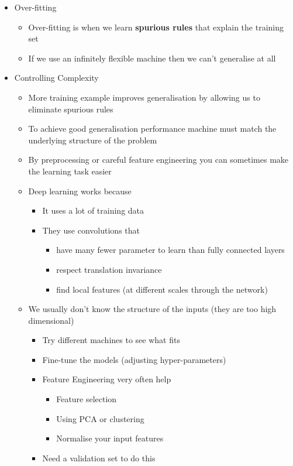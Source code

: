 \documentclass[11pt]{article}
\begin{document}
\begin{itemize}
\item Over-fitting
\begin{itemize}
\item Over-fitting is when we learn \textbf{spurious rules} that explain the
training set
\item If we use an infinitely flexible machine then we can't
generalise at all
\end{itemize}
\item Controlling Complexity
\begin{itemize}
\item More training example improves generalisation by allowing us to
eliminate spurious rules
\item To achieve good generalisation performance machine must match
the underlying structure of the problem
\item By preprocessing or careful feature engineering you can sometimes
make the learning task easier
\item Deep learning works because
\begin{itemize}
\item It uses a lot of training data
\item They use convolutions that
\begin{itemize}
\item have many fewer parameter to learn than fully connected layers
\item respect translation invariance
\item find local features (at different scales through the network)
\end{itemize}
\end{itemize}
\item We usually don't know the structure of the inputs (they are too
high dimensional)
\begin{itemize}
\item Try different machines to see what fits
\item Fine-tune the models (adjusting hyper-parameters)
\item Feature Engineering very often help
\begin{itemize}
\item Feature selection
\item Using PCA or clustering
\item Normalise your input features
\end{itemize}
\item Need a validation set to do this

\end{itemize}
\end{itemize}
\end{itemize}
\end{document}

